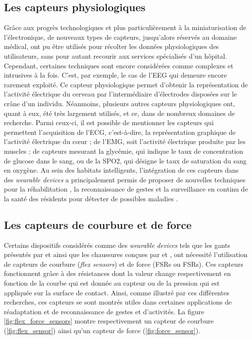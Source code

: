 \subsection{Les capteurs physiologiques}

Grâce aux progrès technologiques et plus particulièrement à la miniaturisation de l'électronique, de nouveaux types de capteurs, jusqu'alors réservés au domaine médical, ont pu être utilisés pour récolter les données physiologiques des utilisateurs, sans pour autant recourir aux services spécialisés d'un hôpital. Cependant, certaines techniques sont encore considérées comme complexes et intrusives à la fois. C'est, par exemple, le cas de l'\ac{EEG} qui demeure encore rarement exploité. Ce capteur physiologique permet d'obtenir la représentation de l'activité électrique du cerveau par l'intermédiaire d'électrodes disposées sur le crâne d'un individu. Néanmoins, plusieurs autres capteurs physiologiques ont, quant à eux, été très largement utilisés, et ce, dans de nombreux domaines de recherche. Parmi ceux-ci, il est possible de mentionner les capteurs qui permettent l'acquisition de l'\ac{ECG}, c'est-à-dire, la représentation graphique de l'activité électrique du c\oe{}ur ; de l'\ac{EMG}, soit l'activité électrique produite par les muscles ; de capteurs mesurant la glycémie, qui indique le taux de concentration de glucose dans le sang, ou de la \ac{SPO2}, qui désigne le taux de saturation du sang en oxygène. Au sein des habitats intelligents, l'intégration de ces capteurs dans des \textit{wearable devices} a principalement permis de proposer de nouvelles techniques pour la réhabilitation \citep{YuanJieFan2014}, la reconnaissance de gestes \citep{Jung2015, Benatti2015, Tavakoli2018} et la surveillance en continu de la santé des résidents pour détecter de possibles maladies \citep{Istepanian2011, Adib2015, Khan2016}.

\subsection{Les capteurs de courbure et de force}

Certains dispositifs considérés comme des \textit{wearable devices} tels que les gants présentés par \cite{Sanford2015} et \cite{Zheng2016} ainsi que les chaussures conçues par \cite{Bamberg2008} et \cite{Bae2013}, ont nécessité l'utilisation de capteurs de courbure (\textit{flex sensors}) et de force (\aclp{FSR} ou \acsp{FSR}). Ces capteurs fonctionnent grâce à des résistances dont la valeur change respectivement en fonction de la courbe qui est donnée au capteur ou de la pression qui est appliquée sur la surface de contact. Ainsi, comme illustré par ces différentes recherches, ces capteurs se sont montrés utiles dans certaines applications de réadaptation et de reconnaissance de gestes et d'activités. La figure \ref{fig:flex_force_sensors} montre respectivement un capteur de courbure (\ref{fig:flex_sensor}) ainsi qu'un capteur de force (\ref{fig:force_sensor}).

